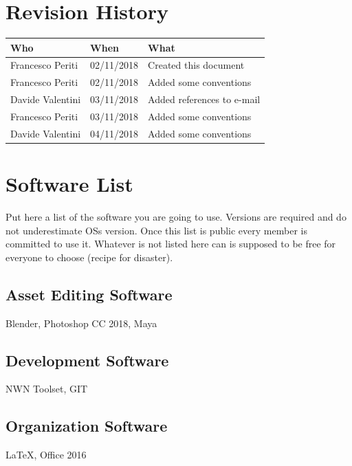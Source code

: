 \documentclass[12pt]{article}
\begin{document}
\clearpage

\section{Revision History}
\begin{center}
\begin{table}[H]
\begin{tabular}{|l|l|l|}
\hline
\cellcolor{lightgray}\textbf{Who} & \cellcolor{lightgray}\textbf{When} & \cellcolor{lightgray}\textbf{What} \\ \hline
Francesco Periti & 02/11/2018 & Created this document \\ \hline
Francesco Periti & 02/11/2018 & Added some conventions \\ \hline
Davide Valentini & 03/11/2018 & Added references to e-mail \\ \hline
Francesco Periti & 03/11/2018 & Added some conventions \\ \hline
Davide Valentini & 04/11/2018 & Added some conventions \\ \hline
\end{tabular}
\end{table}
\end{center}

\clearpage

\section{Software List}
Put here a list of the software you are going to use. Versions are required and do not underestimate OSs version.
Once this list is public every member is committed to use it.
Whatever is not listed here can is supposed to be free for everyone to choose (recipe for disaster).

\subsection{Asset Editing Software}
Blender, Photoshop CC 2018, Maya

\subsection{Development Software}
NWN Toolset, GIT

\subsection{Organization Software}
LaTeX, Office 2016
\end{document}
